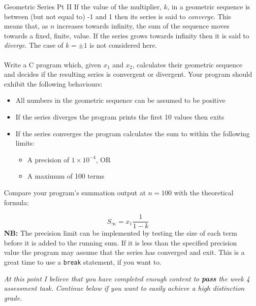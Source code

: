 \documentclass{lab}
\begin{document}
\begin{task}{Geometric Series Pt II}{}
If the value of the multiplier, $k$, in a geometric sequence is between (but not equal to) -1 and 1 then its series is said to \textit{converge}. This means that, as $n$ increases towards infinity, the sum of the sequence moves towards a fixed, finite, value. If the series grows towards infinity then it is said to \textit{diverge}. The case of $k = \pm1$ is not considered here.
\\ \\
Write a C program which, given $x_1$ and $x_2$, calculates their geometric sequence and decides if the resulting series is convergent or divergent. Your program should exhibit the following behaviours: 
\begin{itemize}
\item All numbers in the geometric sequence can be assumed to be positive
\item If the series diverges the program prints the first 10 values then exits
\item If the series converges the program calculates the sum to within the following limits:
	\begin{itemize}
		\item A precision of $1 \times 10^{-4}$, OR
		\item A maximum of 100 terms
	\end{itemize}
\end{itemize}

Compare your program's summation output at $n=100$ with the theoretical formula:

\begin{equation}
S_\infty = x_1 \frac{1}{1-k}
\end{equation}
\textbf{NB:} The precision limit can be implemented by testing the size of each term before it is added to the running sum. If it is less than the specified precision value the program may assume that the series has converged and exit. This is a great time to use a \texttt{break} statement, if you want to.
\end{task}

{\huge\textit{At this point I believe that you have completed enough content to \textbf{pass} the week 4 assessment task. Continue below if you want to easily achieve a high distinction grade.}}
\end{document}
